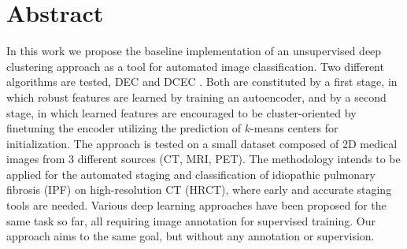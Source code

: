 \chapter*{Abstract}

In this work we propose the baseline implementation of an unsupervised deep clustering approach as a tool for automated image classification. Two different algorithms are tested, DEC \cite{xie2016unsupervised} and DCEC \cite{10.1007/978-3-319-70096-0_39}. Both are constituted by a first stage, in which robust features are learned by training an autoencoder, and by a second stage, in which learned features are encouraged to be cluster-oriented by finetuning the encoder utilizing the prediction of $k$-means centers for initialization. The approach is tested on a small dataset composed of 2D medical images from 3 different sources (CT, MRI, PET). The methodology intends to be applied for the automated staging and classification of idiopathic pulmonary fibrosis (IPF) on high-resolution CT (HRCT), where early and accurate staging tools are needed. Various deep learning approaches have been proposed for the same task so far, all requiring image annotation for supervised training. Our approach aims to the same goal, but without any annotation or supervision.